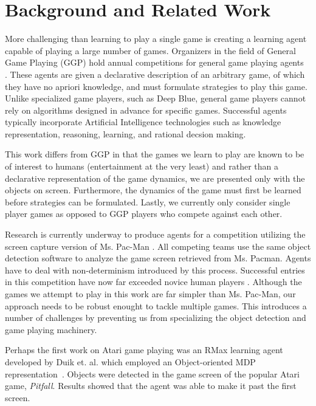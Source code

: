 \documentclass{acm_proc_article-sp}
\begin{document}
\section{Background and Related Work}
\label{sec:background}
More challenging than learning to play a single game is creating a learning agent capable of playing a large number of games. Organizers in the field of General Game Playing (GGP) hold annual competitions for general game playing agents~\cite{genesereth05} . These agents are given a declarative description of an arbitrary game, of which they have no apriori knowledge, and must formulate strategies to play this game. Unlike specialized game players, such as Deep Blue, general game players cannot rely on algorithms designed in advance for specific games. Successful agents typically incorporate Artificial Intelligence technologies such as knowledge representation, reasoning, learning, and rational decsion making. 

This work differs from GGP in that the games we learn to play are known to be of interest to humans (entertainment at the very least) and rather than a declarative representation of the game dynamics, we are presented only with the objects on screen. Furthermore, the dynamics of the game must first be learned before strategies can be formulated. Lastly, we currently only consider single player games as opposed to GGP players who compete against each other.

 Research is currently underway to produce agents for a competition utilizing the screen capture version of Ms. Pac-Man \cite{pacmancompetition}. All competing teams use the same object detection software to analyze the game screen retrieved from Ms. Pacman. Agents have to deal with non-determinism introduced by this process. Successful entries in this competition have now far exceeded novice human players \cite{sigevolution2007}. Although the games we attempt to play in this work are far simpler than Ms. Pac-Man, our approach needs to be robust enought to tackle multiple games. This introduces a number of challenges by preventing us from specializing the object detection and game playing machinery.

Perhaps the first work on Atari game playing was an RMax learning agent developed by Duik et. al. which employed an Object-oriented MDP representation~\cite{duik08}. Objects were detected in the game screen of the popular Atari game, \emph{Pitfall}. Results showed that the agent was able to make it past the first screen.
\end{document}
